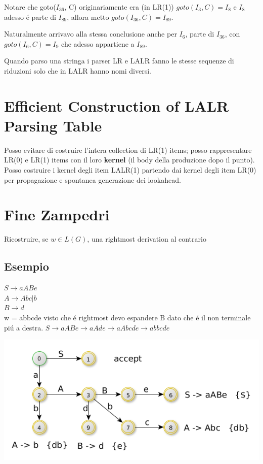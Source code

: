 Notare che goto($I_{36}$, C) originariamente era (in LR(1)) $goto(I_3, C) = I_8$ e $I_8$ adesso \'e parte di $I_{89}$, allora 
metto $goto(I_{36}, C) = I_{89}$. 

Naturalmente arrivavo alla stessa conclusione anche per $I_6$, parte di $I_{36}$, con $goto(I_6, C) =  I_9$ che adesso appartiene a $I_{89}$.

Quando parso una stringa i parser LR e LALR fanno le stesse sequenze di riduzioni solo che in LALR hanno nomi diversi. 

\section{Efficient Construction of LALR Parsing Table}
Posso evitare di costruire l'intera collection di LR(1) items; posso rappresentare LR(0) e LR(1) items con il loro \textbf{kernel}
(il body della produzione dopo il punto).
Posso costruire i kernel degli item LALR(1) partendo dai kernel degli item LR(0) per propagazione e spontanea generazione dei lookahead. 
\section{Fine Zampedri}
Ricostruire, se $w \in L(G)$, una rightmost derivation al contrario
\subsection{Esempio}
$S \rightarrow aABe$\\
$A \rightarrow Abc|b$\\
$B \rightarrow d$\\

w = abbcde visto che \'e rightmost devo espandere B dato che \'e il non terminale pi\'u a destra.
$S \rightarrow aABe \rightarrow aAde \rightarrow aAbcde \rightarrow abbcde $\\

\begin{center}
    \includegraphics[scale=0.6]{Chapters/Img/c02_14.png}\\
\end{center} 

